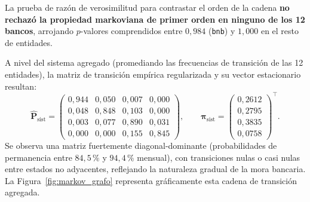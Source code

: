 \documentclass[11pt,letterpaper]{article}
\begin{document}
La prueba de razón de verosimilitud para contrastar el orden de la cadena \textbf{no rechazó la propiedad markoviana de primer orden en ninguno de los 12 bancos}, arrojando \(p\)-valores comprendidos entre \(0{,}984\) (\texttt{bnb}) y \(1{,}000\) en el resto de entidades.

A nivel del sistema agregado (promediando las frecuencias de transición de las 12 entidades), la matriz de transición empírica regularizada y su vector estacionario resultan:
\[
\widehat{\mathbf{P}}_{\text{sist}} =
\begin{pmatrix}
0{,}944 & 0{,}050 & 0{,}007 & 0{,}000 \\
0{,}048 & 0{,}848 & 0{,}103 & 0{,}000 \\
0{,}003 & 0{,}077 & 0{,}890 & 0{,}031 \\
0{,}000 & 0{,}000 & 0{,}155 & 0{,}845
\end{pmatrix},
\qquad
\boldsymbol{\pi}_{\text{sist}} =
\begin{pmatrix}
0{,}2612 \\ 0{,}2795 \\ 0{,}3835 \\ 0{,}0758
\end{pmatrix}^\top.
\]
Se observa una matriz fuertemente diagonal-dominante (probabilidades de permanencia entre \(84{,}5\,\%\) y \(94{,}4\,\%\) mensual), con transiciones nulas o casi nulas entre estados no adyacentes, reflejando la naturaleza gradual de la mora bancaria. La Figura~\ref{fig:markov_grafo} representa gráficamente esta cadena de transición agregada.
\end{document}

